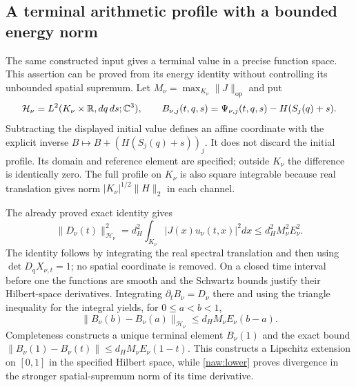 \subsection{A terminal arithmetic profile with a bounded energy norm}

The same constructed input gives a terminal value in a precise
function space. This assertion can be proved from its energy identity
without controlling its unbounded spatial supremum. Let
$M_\nu=\max_{K_\nu}\|J\|_{\mathrm{op}}$ and put
\[
 \mathcal H_\nu=L^2(K_\nu\times\mathbb R,dq\,ds;\mathbb C^3),\qquad
 B_{\nu,j}(t,q,s)=\Psi_{\nu,j}(t,q,s)-H(S_j(q)+s).
\]
Subtracting the displayed initial value defines an affine coordinate
with the explicit inverse $B\mapsto B+(H(S_j(q)+s))_j$.
It does not discard the initial profile. Its domain and reference
element are specified; outside $K_\nu$ the difference is identically
zero. The full profile on $K_\nu$ is also square integrable because
real translation gives norm $|K_\nu|^{1/2}\|H\|_2$ in each channel.

The already proved exact identity gives
\[
 \|D_\nu(t)\|_{\mathcal H_\nu}^2
  =d_H^2\int_{K_\nu}|J(x)u_\nu(t,x)|^2dx
  \leq d_H^2M_\nu^2E_\nu^2.
\]
The identity follows by integrating the real spectral translation and
then using $\det D_qX_{\nu,t}=1$; no spatial coordinate is removed.
On a closed time interval before one the functions are smooth and the
Schwartz bounds justify their Hilbert-space derivatives. Integrating
$\partial_tB_\nu=D_\nu$ there and using the triangle inequality for
the integral yields, for $0\leq a<b<1$,
\begin{equation}
 \|B_\nu(b)-B_\nu(a)\|_{\mathcal H_\nu}
       \leq d_H M_\nu E_\nu(b-a).
 \label{naw:terminalrate}
\end{equation}
Completeness constructs a unique terminal element $B_\nu(1)$ and
the exact bound
$\|B_\nu(1)-B_\nu(t)\|\leq d_HM_\nu E_\nu(1-t)$.
This constructs a Lipschitz extension on $[0,1]$ in the specified
Hilbert space, while \eqref{naw:lower} proves divergence in the stronger
spatial-supremum norm of its time derivative.

